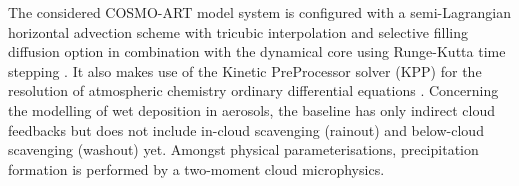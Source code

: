 The   considered  COSMO-ART   model  system   is  configured   with  a
semi-Lagrangian    horizontal   advection    scheme    with   tricubic
interpolation  and selective filling  diffusion option  in combination
with   the   dynamical    core   using   Runge-Kutta   time   stepping
\citep{COSMO-PartI-2011}.    It  also   makes  use   of   the  Kinetic
PreProcessor solver (KPP) for  the resolution of atmospheric chemistry
ordinary  differential equations \citep{Damian-2002}.   Concerning the
modelling  of  wet  deposition  in  aerosols, the  baseline  has  only
indirect  cloud feedbacks  but  does not  include in-cloud  scavenging
(rainout) and below-cloud  scavenging (washout) yet.  Amongst physical
parameterisations,   precipitation  formation   is   performed  by   a
two-moment cloud microphysics.
